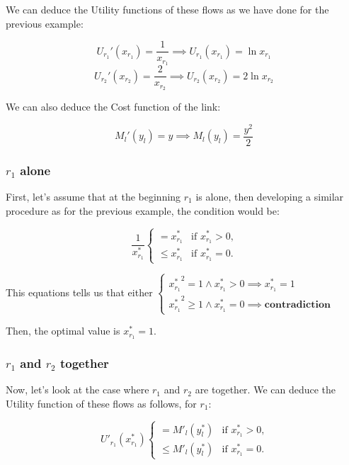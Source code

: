 We can deduce the Utility functions of these flows as we have done for the previous example:

\begin{equation}
U_{r_1}'(x_{r_1}) = \frac{1}{x_{r_1}} \implies U_{r_1}(x_{r_1})=\ln{x_{r_1}}
\label{eq16}
\end{equation}
\begin{equation}
U_{r_2}'(x_{r_2}) = \frac{2}{x_{r_2}} \implies U_{r_2}(x_{r_2})=2\ln{x_{r_2}}
\label{eq17}
\end{equation}

We can also deduce the Cost function of the link:

\begin{equation}
M_l'(y_l) = y \implies M_l(y_l) = \frac{y^2}{2}
\label{eq18}
\end{equation}

\subsubsection{$r_1$ alone}
First, let's assume that at the beginning ${r_1}$ is alone, then developing a similar procedure as for the previous example, the condition would be:

\begin{equation}
\ \frac{1}{x^*_{r_1}}
\begin{cases}
= x^*_{r_1}  & \mbox{if } x^*_{r_1} > 0,\\ 
\leq x^*_{r_1} & \mbox{if } x^*_{r_1} = 0.
\end{cases}
\label{eq19}
\end{equation}

This equations tells us that either 
$\begin{cases}
{x^*_{r_1}}^2 = 1 \land x^*_{r_1} > 0 \implies x^*_{r_1} = 1\\
{x^*_{r_1}}^2 \geq 1 \land x^*_{r_1} = 0 \implies \textbf{contradiction}
\end{cases}$

Then, the optimal value is $x^*_{r_1} = 1$.

\subsubsection{$r_1$ and $r_2$ together}
Now, let's look at the case where ${r_1}$ and ${r_2}$ are together. We can deduce the Utility function of these flows as follows, for ${r_1}$:

\begin{equation}
\ U'_{r_1}(x^*_{r_1})
\begin{cases}
= M'_l(y^*_{l})  & \mbox{if } x^*_{r_1} > 0,\\ 
\leq M'_l(y^*_{l}) & \mbox{if } x^*_{r_1} = 0.
\end{cases}
\label{eq20}
\end{equation}

